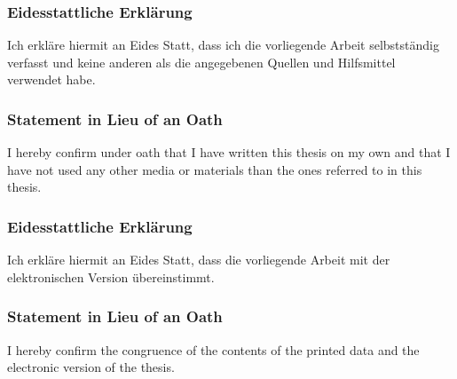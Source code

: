 
\cleardoublepage
%     

% 

\cleardoublepage
\pagestyle{empty}
\setcounter{savepage}{\thepage}
\subsubsection*{Eidesstattliche Erkl{\"a}rung}
Ich erkl{\"a}re hiermit an Eides Statt, dass ich die vorliegende Arbeit selbstst{\"a}ndig verfasst und
keine anderen als die angegebenen Quellen und Hilfsmittel verwendet habe.
\subsubsection*{Statement in Lieu of an Oath}
I hereby confirm under oath that I have written this thesis on my own and that I have not
used any other media or materials than the ones referred to in this thesis.

\vspace{1cm}

\subsubsection*{Eidesstattliche Erkl{\"a}rung}
Ich erkl{\"a}re hiermit an Eides Statt, dass die vorliegende Arbeit mit der elektronischen Version {\"u}bereinstimmt.
\subsubsection*{Statement in Lieu of an Oath}
I hereby confirm the congruence of the contents of the printed data and the electronic version of the thesis.

